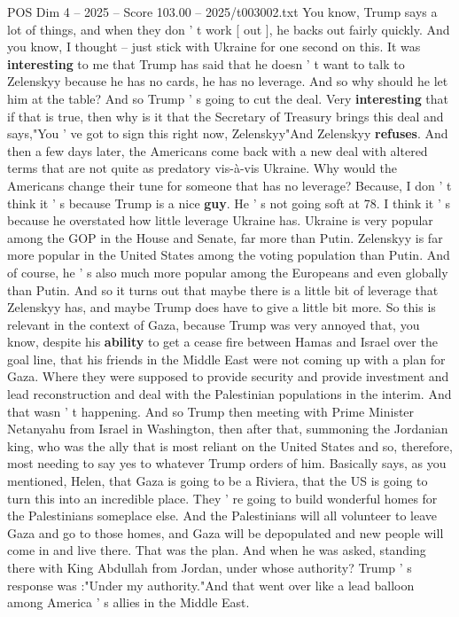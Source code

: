 \begin{textsample}{POS Dim 4 – 2025 – Score 103.00 – 2025/t003002.txt}
You know, Trump says a lot of things, and when they don ' t work [ out ], he backs out fairly quickly.
And you know, I thought -- just stick with Ukraine for one second on this.
It was \textbf{interesting} to me that Trump has said that he doesn ' t want to talk to Zelenskyy because he has no cards, he has no leverage.
And so why should he let him at the table?
And so Trump ' s going to cut the deal.
Very \textbf{interesting} that if that is true, then why is it that the Secretary of Treasury brings this deal and says,"You ' ve got to sign this right now, Zelenskyy"And Zelenskyy \textbf{refuses}.
And then a few days later, the Americans come back with a new deal with altered terms that are not quite as predatory vis-à-vis Ukraine.
Why would the Americans change their tune for someone that has no leverage?
Because, I don ' t think it ' s because Trump is a nice \textbf{guy}.
He ' s not going soft at 78.
I think it ' s because he overstated how little leverage Ukraine has.
Ukraine is very popular among the GOP in the House and Senate, far more than Putin.
Zelenskyy is far more popular in the United States among the voting population than Putin.
And of course, he ' s also much more popular among the Europeans and even globally than Putin.
And so it turns out that maybe there is a little bit of leverage that Zelenskyy has, and maybe Trump does have to give a little bit more.
So this is relevant in the context of Gaza, because Trump was very annoyed that, you know, despite his \textbf{ability} to get a cease fire between Hamas and Israel over the goal line, that his friends in the Middle East were not coming up with a plan for Gaza.
Where they were supposed to provide security and provide investment and lead reconstruction and deal with the Palestinian populations in the interim.
And that wasn ' t happening.
And so Trump then meeting with Prime Minister Netanyahu from Israel in Washington, then after that, summoning the Jordanian king, who was the ally that is most reliant on the United States and so, therefore, most needing to say yes to whatever Trump orders of him.
Basically says, as you mentioned, Helen, that Gaza is going to be a Riviera, that the US is going to turn this into an incredible place.
They ' re going to build wonderful homes for the Palestinians someplace else.
And the Palestinians will all volunteer to leave Gaza and go to those homes, and Gaza will be depopulated and new people will come in and live there.
That was the plan.
And when he was asked, standing there with King Abdullah from Jordan, under whose authority?
Trump ' s response was :"Under my authority."And that went over like a lead balloon among America ' s allies in the Middle East.

\end{textsample}
